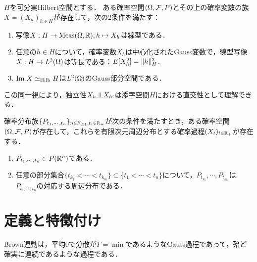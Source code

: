 \documentclass[uplatex,dvipdfmx]{jsreport}
\begin{document}
\begin{corollary}[Hilbert空間により添字付けられた確率過程]
    $H$を可分実Hilbert空間とする．
    ある確率空間$(\Omega,\mathcal{F},P)$とその上の確率変数の族$X=(X_h)_{h\in H}$が存在して，次の2条件を満たす：
    \begin{enumerate}
        \item 写像$X:H\to\mathrm{Meas}(\Omega,\mathbb{R});h\mapsto X_h$は線型である．
        \item 任意の$h\in H$について，確率変数$X_h$は中心化されたGauss変数で，線型写像$X:H\to L^2(\Omega)$は等長である：$E[X_h^2]=\|h\|^2_H$．
        \item $\mathrm{Im}\; X\simeq_{\mathrm{Hilb}} H$は$L^2(\Omega)$のGauss部分空間である．
    \end{enumerate}
\end{corollary}
\begin{remark}
    この同一視により，独立性$X_h\indep X_{h'}$は添字空間$H$における直交性として理解できる．
\end{remark}

\begin{theorem}[確率過程版]\label{thm-Kolmogorov-extension-theorem}
    確率分布族$\{P_{t_1,\cdots,t_n}\}_{n\in\mathbb{N}_{\ge1},t_i\in\mathbb{R}_+}$が次の条件を満たすとき，ある確率空間$(\Omega,\mathcal{F},P)$が存在して，これらを有限次元周辺分布とする確率過程$(X_t)_{t\in\mathbb{R}_+}$が存在する．
    \begin{enumerate}[({C}1)]
        \item $P_{t_1,\cdots,t_n}\in P(\mathbb{R}^n)$である．
        \item 任意の部分集合$\{t_{k_1}<\cdots<t_{k_m}\}\subset\{t_1<\cdots<t_n\}$について，$P_{t_{k_1}},\cdots,P_{t_{k_m}}$は$P_{t_1,\cdots,t_n}$の対応する周辺分布である．
    \end{enumerate}
\end{theorem}

\section{定義と特徴付け}

\begin{tcolorbox}[colframe=ForestGreen, colback=ForestGreen!10!white,breakable,colbacktitle=ForestGreen!40!white,coltitle=black,fonttitle=\bfseries\sffamily,
title=]
    Brown運動は，平均$0$で分散が$\Gamma=\min$であるようなGauss過程であって，殆ど確実に連続であるような過程である．
\end{tcolorbox}
\end{document}
